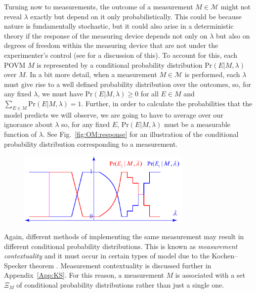 \documentclass[DIV=calc,fontsize=12pt]{scrartcl} %
\theoremstyle{definition}
\theoremstyle{plain}
\begin{document}
Turning now to measurements, the outcome of a measurement $M \in
\mathcal{M}$ might not reveal $\lambda$ exactly but depend on it only
probabilistically.  This could be because nature is fundamentally
stochastic, but it could also arise in a deterministic theory if the
response of the measuring device depends not only on $\lambda$ but
also on degrees of freedom within the measuring device that are not
under the experimenter's control (see \cite{Harrigan2007} for a
discussion of this).  To account for this, each POVM $M$ is
represented by a conditional probability distribution
$\text{Pr}(E|M,\lambda)$ over $M$.  In a bit more detail, when a
measurement $M \in \mathcal{M}$ is performed, each $\lambda$ must give
rise to a well defined probability distribution over the outcomes, so,
for any fixed $\lambda$, we must have $\text{Pr}(E|M,\lambda) \geq 0$
for all $E \in M$ and $\sum_{E \in M} \text{Pr}(E|M,\lambda) = 1$.
Further, in order to calculate the probabilities that the model
predicts we will observe, we are going to have to average over our
ignorance about $\lambda$ so, for any fixed $E$,
$\text{Pr}(E|M,\lambda)$ must be a measurable function of $\lambda$.
See Fig.~\ref{fig:OM:response} for an illustration of the conditional
probability distribution corresponding to a measurement.
\begin{figure}[t!]
\centering
\includegraphics[width=85mm]{Fig6.pdf}
\caption{}
\end{figure}

Again, different methods of implementing the same measurement may
result in different conditional probability distributions. This is
known as \emph{measurement contextuality} and it must occur in certain
types of model due to the Kochen--Specker theorem \cite{Kochen1967}.
Measurement contextuality is discussed further in
Appendix~\ref{App:KS}.  For this reason, a measurement $M$ is
associated with a set $\Xi_M$ of conditional probability distributions
rather than just a single one.
\end{document}
